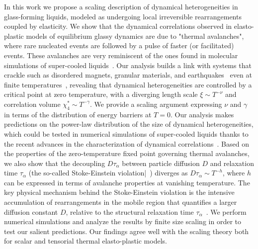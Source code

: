 \documentclass[pre,twocolumn,superscriptaddress,tightenlines,showpacs,longbibliography,floatfix,footinbib]{revtex4-1}
\begin{document}
In this work we propose a scaling description of dynamical heterogeneities in glass-forming liquids, modeled as undergoing local irreversible rearrangements coupled by elasticity. 
We show that the dynamical correlations observed in elasto-plastic models of equilibrium glassy dynamics \cite{ozawa2023elasticity} are due to "thermal avalanches", where rare nucleated events are followed by a pulse of faster (or facilitated) events. These avalanches are very reminiscent of the ones found in molecular simulations of super-cooled liquids~\cite{candelier2010spatiotemporal,keys2011excitations,yanagishima2017common}. 
Our analysis builds a link with systems that crackle such as disordered magnets, granular materials, and earthquakes~\cite{sethna2001crackling,rosso2022avalanches} even at finite temperatures~\cite{popovic2021thermally,purrello2017creep,yao2023thermal,korchinski2022dynamic}, revealing that dynamical heterogeneities are controlled by a critical point at zero temperature, with a diverging length scale $\xi \sim T^{-\nu}$ and correlation volume $\chi_4^* \sim T^{-\gamma}$. We provide a scaling argument expressing $\nu$ and $\gamma$ in terms of the distribution of energy barriers at $T=0$. Our analysis makes predictions on the power-law distribution of the size of dynamical heterogeneities, which could be tested in numerical simulations of super-cooled liquids thanks to the recent advances in the characterization of dynamical correlations~\cite{scalliet2021excess,scalliet2022thirty}. %
Based on the properties of the zero-temperature fixed point governing thermal avalanches, we also show that the decoupling $D \tau_\alpha$ between particle diffusion $D$ and relaxation time $\tau_\alpha$ (the so-called Stoke-Einstein violation|~\cite{tarjus1995breakdown,ediger2000spatially,sengupta2013breakdown,charbonneau2014hopping,kawasaki2017identifying}) diverges as $D \tau_\alpha \sim T^{-h}$, where $h$ can be expressed in terms of avalanche properties at vanishing temperature. 
The key physical mechanism behind the Stoke-Einstein violation is the intensive accumulation of rearrangements in the mobile region that quantifies a larger diffusion constant $D$, relative to the structural relaxation time $\tau_\alpha$~\cite{jung2004excitation,berthier2004length,hedges2007decoupling,chaudhuri2007universal,pastore2021breakdown}. 
We perform numerical simulations and analyze the results by finite size scaling 
in order to test our salient predictions. Our findings agree well with the scaling theory both for scalar and tensorial thermal elasto-plastic models.
\end{document}
